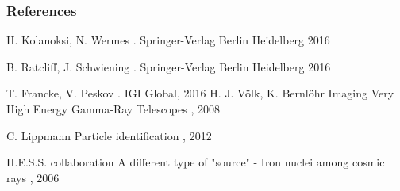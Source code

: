 \documentclass[aspectratio=1610, 10pt]{beamer}
\begin{document}
\begin{frame}[allowframebreaks]
        \frametitle{References}
        
     \begin{thebibliography}{10}
        \beamertemplatebookbibitems
          H. Kolanoksi, N. Wermes
          .
          \newblock  Springer-Verlag Berlin Heidelberg 2016

          B. Ratcliff, J. Schwiening
          .
          \newblock  Springer-Verlag Berlin Heidelberg 2016

          T. Francke, V. Peskov
          .
          \newblock  IGI Global, 2016
          \beamertemplatearticlebibitems
            H. J. Völk, K. Bernlöhr
            \newblock Imaging Very High Energy Gamma-Ray Telescopes
            , 2008

            C. Lippmann
            \newblock Particle identification
            , 2012

             H.E.S.S. collaboration
            \newblock A different type of "source" - Iron nuclei among cosmic rays
            , 2006
      \end{thebibliography}
\end{frame}
\end{document}
